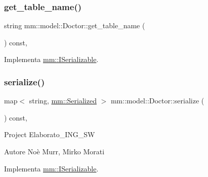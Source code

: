 \mbox{\label{classmm_1_1model_1_1_doctor_af4c37e48f9e5ff26f2295678f10afaa3}} 
\subsubsection{\texorpdfstring{get\+\_\+table\+\_\+name()}{get\_table\_name()}}
{\footnotesize\ttfamily string mm\+::model\+::\+Doctor\+::get\+\_\+table\+\_\+name (\begin{DoxyParamCaption}{ }\end{DoxyParamCaption}) const\hspace{0.3cm}{\ttfamily [override]}, {\ttfamily [virtual]}}



Implementa \mbox{\hyperlink{classmm_1_1_i_serializable_a9717e6da47fcbac3ffa2e68152464e0a}{mm\+::\+I\+Serializable}}.

\mbox{\label{classmm_1_1model_1_1_doctor_a2171a9cb9c8a24ad0c0331edae957910}} 
\subsubsection{\texorpdfstring{serialize()}{serialize()}}
{\footnotesize\ttfamily map$<$ string, \mbox{\hyperlink{structmm_1_1_serialized}{mm\+::\+Serialized}} $>$ mm\+::model\+::\+Doctor\+::serialize (\begin{DoxyParamCaption}{ }\end{DoxyParamCaption}) const\hspace{0.3cm}{\ttfamily [override]}, {\ttfamily [virtual]}}

Project Elaborato\+\_\+\+I\+N\+G\+\_\+\+SW \begin{DoxyAuthor}{Autore}
Noè Murr, Mirko Morati 
\end{DoxyAuthor}


Implementa \mbox{\hyperlink{classmm_1_1_i_serializable_a20a59e2324c8dbf6fefe4d11ae89d0fb}{mm\+::\+I\+Serializable}}.

\mbox{\label{classmm_1_1model_1_1_doctor_a20bedf6695024e1930d033995a2ec5bf}} 

